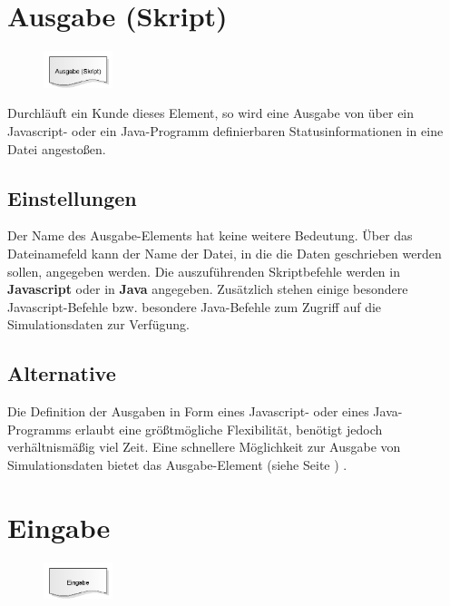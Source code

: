 \section{Ausgabe (Skript)}
\label{ref:ModelElementOutputJS}

\begin{figure}
\vspace{-22pt}
\includegraphics[width=2cm]{imageModelElementOutputJS.png}
\vspace{-22pt}
\end{figure}

Durchläuft ein Kunde dieses Element, so wird eine Ausgabe von über ein Javascript-
oder ein Java-Programm definierbaren Statusinformationen in eine Datei angestoßen.

\subsection*{Einstellungen}

Der Name des Ausgabe-Elements hat keine weitere Bedeutung. Über das Dateinamefeld kann der Name der Datei,
in die die Daten geschrieben werden sollen, angegeben werden. Die auszuführenden Skriptbefehle werden in
\textbf{Javascript} oder in \textbf{Java} angegeben. Zusätzlich stehen einige
besondere Javascript-Befehle bzw. besondere Java-Befehle 
zum Zugriff auf die Simulationsdaten zur Verfügung.

\subsection*{Alternative}

Die Definition der Ausgaben in Form eines Javascript- oder eines Java-Programms erlaubt eine größtmögliche Flexibilität,
benötigt jedoch verhältnismäßig viel Zeit. Eine schnellere Möglichkeit zur Ausgabe von Simulationsdaten
bietet das Ausgabe-Element (siehe Seite \pageref{ref:ModelElementOutput}) .


\section{Eingabe}
\label{ref:ModelElementInput}

\begin{figure}
\vspace{-22pt}
\includegraphics[width=2cm]{imageModelElementInput.png}
\vspace{-22pt}
\end{figure}

